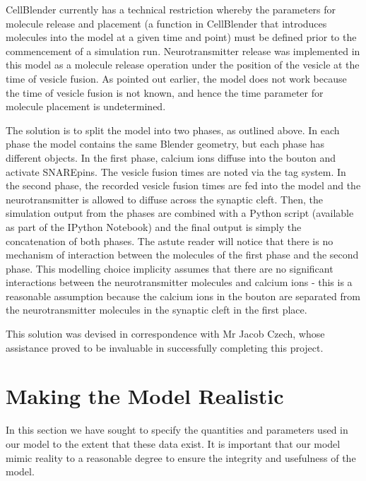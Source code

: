 \documentclass[a4paper]{article}
\begin{document}
CellBlender currently has a technical restriction whereby the parameters for molecule release and placement (a function in CellBlender that introduces molecules into the model at a given time and point) must be defined prior to the commencement of a simulation run. Neurotransmitter release was implemented in this model as a molecule release operation under the position of the vesicle at the time of vesicle fusion. As pointed out earlier, the model does not work because the time of vesicle fusion is not known, and hence the time parameter for molecule placement is undetermined.

The solution is to split the model into two phases, as outlined above. In each phase the model contains the same Blender geometry, but each phase has different objects. In the first phase, calcium ions diffuse into the bouton and activate SNAREpins. The vesicle fusion times are noted via the tag system. In the second phase, the recorded vesicle fusion times are fed into the model and the neurotransmitter is allowed to diffuse across the synaptic cleft. Then, the simulation output from the phases are combined with a Python script (available as part of the IPython Notebook) and the final output is simply the concatenation of both phases. The astute reader will notice that there is no mechanism of interaction between the molecules of the first phase and the second phase. This modelling choice implicity assumes that there are no significant interactions between the neurotransmitter molecules and calcium ions - this is a reasonable assumption because the calcium ions in the bouton are separated from the neurotransmitter molecules in the synaptic cleft in the first place.

This solution was devised in correspondence with Mr Jacob Czech, whose assistance proved to be invaluable in successfully completing this project.

\section{Making the Model Realistic}
In this section we have sought to specify the quantities and parameters used in our model to the extent that these data exist. It is important that our model mimic reality to a reasonable degree to ensure the integrity and usefulness of the model.
\end{document}
